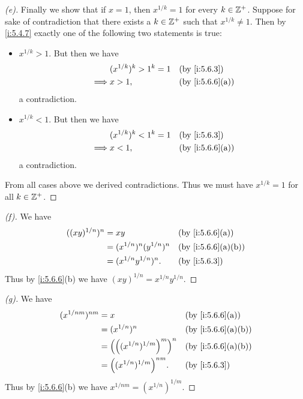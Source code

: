 \begin{proof}[(e)]
  Finally we show that if \(x = 1\), then \(x^{1 / k} = 1\) for every \(k \in \mathbb{Z}^+\).
  Suppose for sake of contradiction that there exists a \(k \in \mathbb{Z}^+\) such that \(x^{1 / k} \neq 1\).
  Then by \cref{i:5.4.7} exactly one of the following two statements is true:
  \begin{itemize}
    \item \(x^{1 / k} > 1\).
          But then we have
          \begin{align*}
                     & (x^{1 / k})^k > 1^k = 1 &  & \by{i:5.6.3}    \\
            \implies & x > 1,                  &  & \by{i:5.6.6}[a]
          \end{align*}
          a contradiction.
    \item \(x^{1 / k} < 1\).
          But then we have
          \begin{align*}
                     & (x^{1 / k})^k < 1^k = 1 &  & \by{i:5.6.3}    \\
            \implies & x < 1,                  &  & \by{i:5.6.6}[a]
          \end{align*}
          a contradiction.
  \end{itemize}
  From all cases above we derived contradictions.
  Thus we must have \(x^{1 / k} = 1\) for all \(k \in \mathbb{Z}^+\).
\end{proof}

\begin{proof}[(f)]
  We have
  \begin{align*}
    ((xy)^{1 / n})^n & = xy                          &  & \by{i:5.6.6}[a]   \\
                     & = (x^{1 / n})^n (y^{1 / n})^n &  & \by{i:5.6.6}[a,b] \\
                     & = (x^{1 / n} y^{1 / n})^n.    &  & \by{i:5.6.3}
  \end{align*}
  Thus by \cref{i:5.6.6}(b) we have \((xy)^{1 / n} = x^{1 / n} y^{1 / n}\).
\end{proof}

\begin{proof}[(g)]
  We have
  \begin{align*}
    (x^{1 / nm})^{nm} & = x                                 &  & \by{i:5.6.6}[a]   \\
                      & = (x^{1 / n})^n                     &  & \by{i:5.6.6}[a,b] \\
                      & = \pa{\pa{(x^{1 / n})^{1 / m}}^m}^n &  & \by{i:5.6.6}[a,b] \\
                      & = \pa{(x^{1 / n})^{1 / m}}^{nm}.    &  & \by{i:5.6.3}
  \end{align*}
  Thus by \cref{i:5.6.6}(b) we have \(x^{1 / nm} = (x^{1 / n})^{1 / m}\).
\end{proof}

